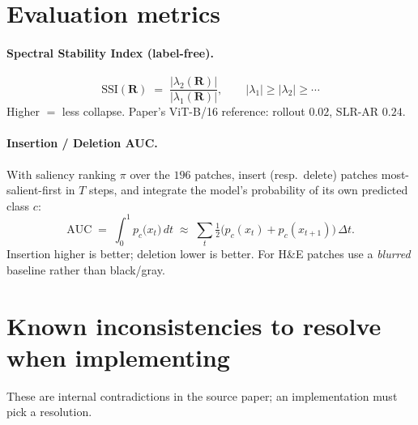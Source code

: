 \documentclass[11pt]{article}
\newcommand{\R}{\mathbf{R}}
\begin{document}
\section{Evaluation metrics}

\paragraph{Spectral Stability Index (label-free).}
\begin{equation}
\mathrm{SSI}(\R) \;=\; \frac{|\lambda_2(\R)|}{|\lambda_1(\R)|},
\qquad |\lambda_1|\ge|\lambda_2|\ge\cdots
\end{equation}
Higher $=$ less collapse. Paper's ViT-B/16 reference: rollout $0.02$, SLR-AR $0.24$.

\paragraph{Insertion / Deletion AUC.} With saliency ranking
$\pi$ over the $196$ patches, insert (resp.\ delete) patches most-salient-first in
$T$ steps, and integrate the model's probability of its own predicted class $c$:
\begin{equation}
\mathrm{AUC} \;=\; \int_{0}^{1} p_c\big(x_t\big)\,dt
\;\approx\; \sum_{t} \tfrac{1}{2}\big(p_c(x_t)+p_c(x_{t+1})\big)\,\Delta t .
\end{equation}
Insertion higher is better; deletion lower is better.
For H\&E patches use a \emph{blurred} baseline rather than black/gray.

\section{Known inconsistencies to resolve when implementing}
\label{sec:caveats}

These are internal contradictions in the source paper; an implementation must pick
a resolution.
\end{document}
